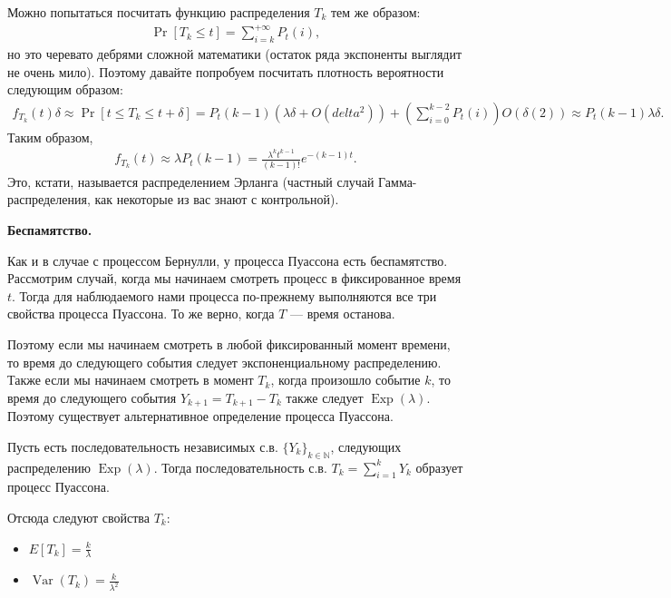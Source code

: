 \documentclass[12pt]{article}
\newcommand\N{\mathbb{N}}
\DeclareMathOperator{\Exp}{Exp}
\DeclareMathOperator{\Var}{Var}
\begin{document}
Можно попытаться посчитать функцию распределения $T_k$ тем же образом:
\begin{align*}
  \Pr[T_k \le t] = \sum_{i = k}^{+\infty} P_t(i),
\end{align*}
но это черевато дебрями сложной математики (остаток ряда экспоненты выглядит не очень мило). Поэтому давайте попробуем посчитать плотность вероятности следующим образом:
\begin{align*}
  f_{T_k}(t) \delta \approx \Pr[t \le T_k \le t + \delta] = P_t(k - 1) (\lambda \delta + O(delta^2)) + (\sum_{i = 0}^{k - 2} P_t(i)) O(\delta(2)) \approx  P_t(k - 1)\lambda \delta.  
\end{align*}
Таким образом, 
\begin{align*}
  f_{T_k}(t) \approx \lambda P_t(k - 1) = \frac{\lambda^k t^{k - 1}}{(k - 1)!}e^{-(k - 1)t}.
\end{align*}
Это, кстати, называется распределением Эрланга (частный случай Гамма-распределения, как некоторые из вас знают с контрольной).

\textbf{Беспамятство.}

Как и в случае с процессом Бернулли, у процесса Пуассона есть беспамятство. Рассмотрим случай, когда мы начинаем смотреть процесс в фиксированное время $t$. Тогда для наблюдаемого нами процесса по-прежнему выполняются все три свойства процесса Пуассона. То же верно, когда $T$ --- время останова.

Поэтому если мы начинаем смотреть в любой фиксированный момент времени, то время до следующего события следует экспоненциальному распределению. Также если мы начинаем смотреть в момент $T_k$, когда произошло событие $k$, то время до следующего события $Y_{k + 1} = T_{k + 1} - T_k$ также следует $\Exp(\lambda)$. Поэтому существует альтернативное определение процесса Пуассона.

Пусть есть последовательность независимых с.в. $\{Y_k\}_{k \in \N}$, следующих распределению $\Exp(\lambda)$. Тогда последовательность с.в. $T_k = \sum_{i = 1}^k Y_k$ образует процесс Пуассона.

Отсюда следуют свойства $T_k$:
\begin{itemize}
  \item $E[T_k] = \frac{k}{\lambda}$
  \item $\Var(T_k) = \frac{k}{\lambda^2}$
\end{itemize}
\end{document}
